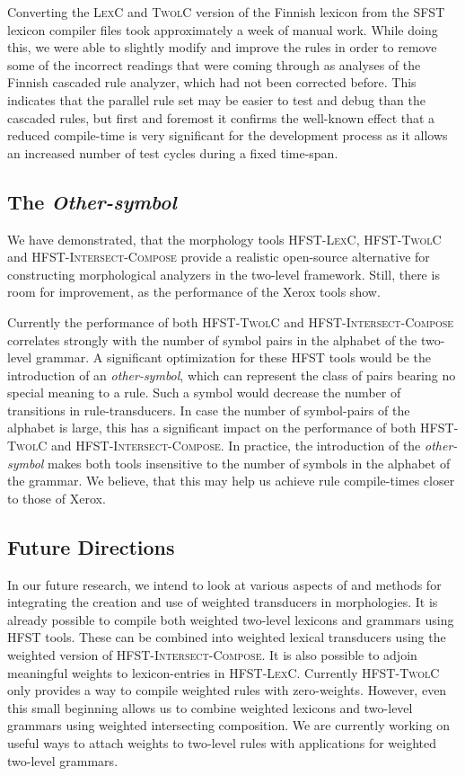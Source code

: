 \documentclass[postprint]{flammie}
\begin{document}
Converting the \textsc{LexC} and \textsc{TwolC} version of the Finnish
lexicon from the \textsc{SFST} lexicon compiler files took
approximately a week of manual work. While doing this, we were able to
slightly modify and improve the rules in order to remove some of the
incorrect readings that were coming through as analyses of the Finnish
cascaded rule analyzer, which had not been corrected before. This
indicates that the parallel rule set may be easier to test and debug
than the cascaded rules, but first and foremost it confirms the
well-known effect that a reduced compile-time is very significant for
the development process as it allows an increased number of test
cycles during a fixed time-span.

\subsection{The \textit{Other-symbol}}
 
We have demonstrated, that the morphology tools \textsc{HFST-LexC},
\textsc{HFST-TwolC} and \textsc{HFST-Intersect-Compose} provide a
realistic open-source alternative for constructing morphological
analyzers in the two-level framework. Still, there is room for
improvement, as the performance of the Xerox tools show.

Currently the performance of both \textsc{HFST-TwolC} and
\textsc{HFST-Intersect-Compose} correlates strongly with the number of
symbol pairs in the alphabet of the two-level grammar. A significant
optimization for these \textsc{HFST} tools would be the introduction
of an \textit{other-symbol}, which can represent the class of pairs
bearing no special meaning to a rule. Such a symbol would decrease the
number of transitions in rule-transducers. In case the number of
symbol-pairs of the alphabet is large, this has a significant impact
on the performance of both \textsc{HFST-TwolC} and
\textsc{HFST-Intersect-Compose}. In practice, the introduction of the
\textit{other-symbol} makes both tools insensitive to the number of
symbols in the alphabet of the grammar. We believe, that this may help
us achieve rule compile-times closer to those of Xerox.

\subsection{Future Directions} 

In our future research, we intend to look at various aspects of and
methods for integrating the creation and use of weighted transducers
in morphologies. It is already possible to compile both weighted
two-level lexicons and grammars using \textsc{HFST} tools. These can
be combined into weighted lexical transducers using the weighted
version of \textsc{HFST-Intersect-Compose}. It is also possible to
adjoin meaningful weights to lexicon-entries in \textsc{HFST-LexC}.
Currently \textsc{HFST-TwolC} only provides a way to compile weighted
rules with zero-weights. However, even this small beginning allows us
to combine weighted lexicons and two-level grammars using weighted
intersecting composition. We are currently working on useful ways to
attach weights to two-level rules with applications for weighted
two-level grammars.
\end{document}
